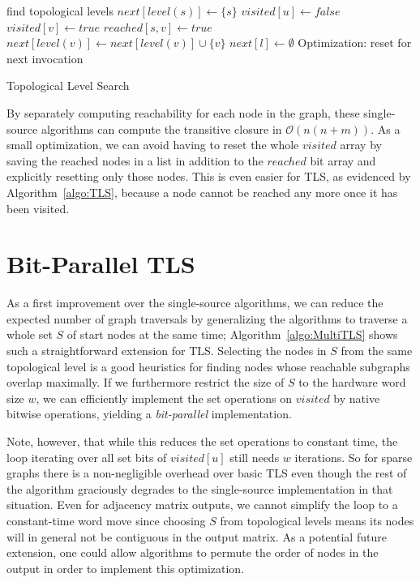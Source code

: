 \documentclass[12pt,a4paper,twoside]{article}
\begin{document}
\begin{algorithm}
  \begin{algorithmic}
      \State find topological levels
      \State $next[level(s)] \gets \{s\}$
          \State $visited[u] \gets false$
              \State $visited[v] \gets true$
              \State $reached[s, v] \gets true$
              \State $next[level(v)] \gets next[level(v)] \cup \{v\}$
            \EndIf
          \EndFor
        \EndFor
        \State $next[l] \gets \emptyset$ \Comment Optimization: reset for next invocation
      \EndFor
    \EndFunction
  \end{algorithmic}
  \caption{Topological Level Search}
  \label{algo:TLS}
\end{algorithm}

By separately computing reachability for each node in the graph, these single-source algorithms can compute the transitive closure in $\mathcal{O}(n(n+m))$. As a small optimization, we can avoid having to reset the whole $visited$ array by saving the reached nodes in a list in addition to the $reached$ bit array and explicitly resetting only those nodes. This is even easier for TLS, as evidenced by Algorithm~\ref{algo:TLS}, because a node cannot be reached any more once it has been visited.

\section{Bit-Parallel TLS}

As a first improvement over the single-source algorithms, we can reduce the expected number of graph traversals by generalizing the algorithms to traverse a whole set $S$ of start nodes at the same time; Algorithm~\ref{algo:MultiTLS} shows such a straightforward extension for TLS. Selecting the nodes in $S$ from the same topological level is a good heuristics for finding nodes whose reachable subgraphs overlap maximally. If we furthermore restrict the size of $S$ to the hardware word size $w$, we can efficiently implement the set operations on $visited$ by native bitwise operations, yielding a \emph{bit-parallel} implementation.

Note, however, that while this reduces the set operations to constant time, the loop iterating over all set bits of $visited[u]$ still needs $w$ iterations. So for sparse graphs there is a non-negligible overhead over basic TLS even though the rest of the algorithm graciously degrades to the single-source implementation in that situation. Even for adjacency matrix outputs, we cannot simplify the loop to a constant-time word move since choosing $S$ from topological levels means its nodes will in general not be contiguous in the output matrix. As a potential future extension, one could allow algorithms to permute the order of nodes in the output in order to implement this optimization.
\end{document}
